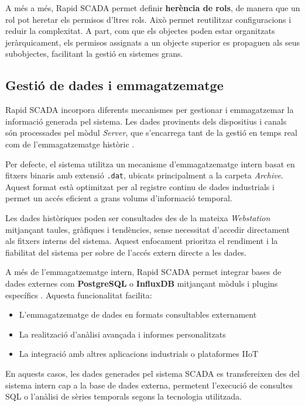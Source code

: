 \documentclass[a4paper,11pt,DIV=13,headings=normal,abstract=true,twoside=semi]{article}
\begin{document}
A més a més, Rapid SCADA permet definir \textbf{herència de rols}, de manera que un rol pot heretar els permisos d'ltres rols. Això permet reutilitzar configuracions i reduir la complexitat. A part, com que els objectes poden estar organitzats jeràrquicament, els permisos assignats a un objecte superior es propaguen als seus subobjectes, facilitant la gestió en sistemes grans.


\subsection{Gestió de dades i emmagatzematge}

Rapid SCADA incorpora diferents mecanismes per gestionar i emmagatzemar la informació generada pel sistema. Les dades provinents dels dispositius i canals són processades pel mòdul \textit{Server}, que s'encarrega tant de la gestió en temps real com de l'emmagatzematge històric \cite{rapidscada_apps}.

Per defecte, el sistema utilitza un mecanisme d'emmagatzematge intern basat en fitxers binaris amb extensió \texttt{.dat}, ubicats principalment a la carpeta \textit{Archive}. Aquest format està optimitzat per al registre continu de dades industrials i permet un accés eficient a grans volums d'informació temporal.

Les dades històriques poden ser consultades des de la mateixa \textit{Webstation} mitjançant taules, gràfiques i tendències, sense necessitat d'accedir directament als fitxers interns del sistema. Aquest enfocament prioritza el rendiment i la fiabilitat del sistema per sobre de l'accés extern directe a les dades.

A més de l'emmagatzematge intern, Rapid SCADA permet integrar bases de dades externes com \textbf{PostgreSQL} o \textbf{InfluxDB} mitjançant mòduls i plugins específics \cite{rapidscada_db_export}. Aquesta funcionalitat facilita:

\begin{itemize}
    \item L'emmagatzematge de dades en formats consultables externament
    \item La realització d'anàlisi avançada i informes personalitzats
    \item La integració amb altres aplicacions industrials o plataformes IIoT
\end{itemize}

En aquests casos, les dades generades pel sistema SCADA es transfereixen des del sistema intern cap a la base de dades externa, permetent l'execució de consultes SQL o l'anàlisi de sèries temporals segons la tecnologia utilitzada.
\end{document}
